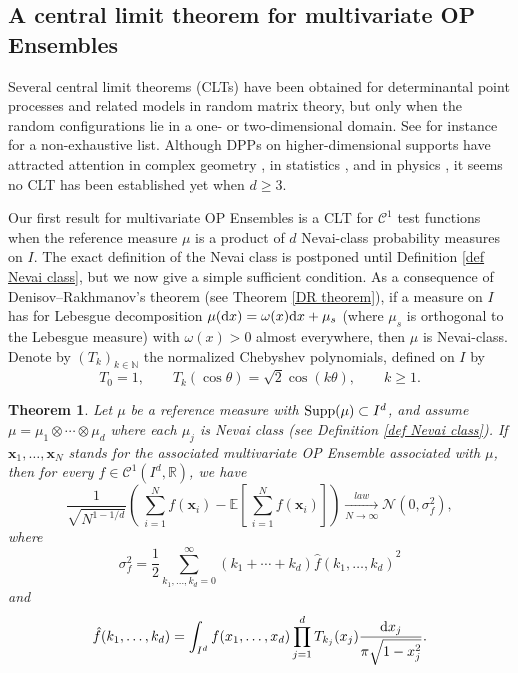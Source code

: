 \documentclass[a4paper,11pt]{article}
\numberwithin{equation}{section}
\newtheorem{theorem}{Theorem}[]
\theoremstyle{definition}
\newcommand{\eq}{\begin{equation}}
\newcommand{\qe}{\end{equation}}
\newcommand{\R}{\mathbb{R}}
\newcommand{\E}{\mathbb{E}}
\newcommand{\Supp}{{\rm Supp}}
\newcommand{\bv}{\mathbf}
\renewcommand{\geq}{\geqslant}
\renewcommand{\d}{ {\rm d}}
\begin{document}
\subsection{A central limit theorem for multivariate OP Ensembles}
\label{sec CLT MOPE}
Several central limit theorems (CLTs) have been obtained for determinantal point processes and related
models in random matrix theory, but only when the random configurations lie in a one- or two-dimensional
domain. See for instance \citep{Joh97, Joh98, DiEv01, Sos02, Pas06, Rivi07,
  Pop09, KrSh10, AmHeMa11, AmHeMa15, Ber12, Shc13, BrDu13, BrDu14, JoLa15,
  Lam15a, Lam15b} for a non-exhaustive list. Although DPPs on higher-dimensional supports have attracted attention in complex
geometry \citep{Ber09,Ber09b, Ber13, Ber14}, in statistics \citep{LaMoRu15, MNPR15}, and in physics \citep{ToScZa08, ScZaTo09},
it seems no CLT has been established yet when $d\geq 3$.

Our first result for multivariate OP Ensembles is a CLT for $\mathscr C^1$ test
functions when the reference measure $\mu$ is a product of $d$ Nevai-class
probability measures on $I$. The exact definition of the Nevai class is
postponed until Definition \ref{def Nevai class}, but we now give a simple
sufficient condition. As a
consequence of Denisov--Rakhmanov's theorem (see Theorem \ref{DR theorem}), if a
measure on $I$ has for Lebesgue decomposition $\mu(\d x)=\omega(x)\d x +
\mu_{s}$ (where $\mu_s$ is orthogonal to the Lebesgue measure) with
$\omega(x)>0$ almost everywhere, then  $\mu$ is Nevai-class. Denote by $(T_k)_{k\in\mathbb{N}}$
the normalized Chebyshev polynomials, defined on $I$ by
$$
T_0=1,\qquad T_k(\cos\theta)=\sqrt 2\cos(k\theta),\qquad k\geq 1.
$$

\begin{theorem}
\label{th CLT general}
Let $\mu$ be a reference measure with $\Supp(\mu)\subset I^d$, and assume
$\mu=\mu_1\otimes \cdots\otimes\mu_d$ where each $\mu_j$ is Nevai class (see
Definition \ref{def Nevai class}). If $\bv x_1,\ldots,\bv x_N$ stands for the
associated multivariate OP Ensemble associated with $\mu$, then for every $f\in\mathscr C^1(I^d,\R)$, we have
$$
 \frac1{\sqrt{N^{1-1/d}}}\left(\ \sum_{i=1}^Nf(\bv x_i) -  \E\left[\,\sum_{i=1}^Nf(\bv x_i)\right]\right)\xrightarrow[N\to\infty]{law } \mathcal N(0,\sigma_f^2),
$$
where
\eq
\sigma_f^2=\frac12\sum_{k_1,\ldots,k_d=0}^\infty (k_1+\cdots+k_d){ \hat f(k_1,\ldots,k_d)}^2
\qe
and
\eq
\label{f hat}
\hat f(k_1,\ldots,k_d)=\int_{I^d} f(x_1,\ldots,x_d)\prod_{j=1}^d T_{k_j}(x_j) \frac{\d x_j}{\pi\sqrt{1-x_j^2}}.
\qe
\end{theorem}
\end{document}
